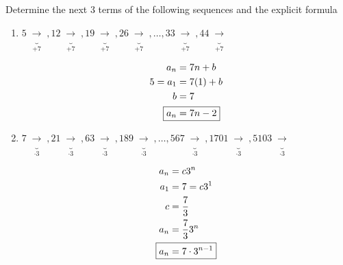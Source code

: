 \documentclass[../../Main.tex]{subfiles}
\begin{document}
\begin{example}
    Determine the next 3 terms of the following sequences and the explicit formula

    \begin{enumerate}
        \item 
        {   
            $
                5\;\underbrace{\longrightarrow}_{+7}\;, 
                12\;\underbrace{\longrightarrow}_{+7}\;, 
                19\;\underbrace{\longrightarrow}_{+7}\;, 
                26\;\underbrace{\longrightarrow}_{+7}\;, 
                \ldots, 
                33\;\underbrace{\longrightarrow}_{+7}\;, 
                44\;\underbrace{\longrightarrow}_{+7}\;
            $
    
            \begin{solution}
                \begin{align*}
                    a_n &= 7n + b \\
                    5 = a_1 &= 7(1) + b \\
                    b &= 7 \\
                    \Aboxed{a_n &= 7n -2} \\
                \end{align*}
            \end{solution}
        }

        \item
        {
            $
                7\;\underbrace{\longrightarrow}_{\cdot 3}\;,
                21\;\underbrace{\longrightarrow}_{\cdot 3}\;,
                63\;\underbrace{\longrightarrow}_{\cdot 3}\;,
                189\;\underbrace{\longrightarrow}_{\cdot 3}\;,
                \ldots,
                567\;\underbrace{\longrightarrow}_{\cdot 3}\;,
                1701\;\underbrace{\longrightarrow}_{\cdot 3}\;,
                5103\;\underbrace{\longrightarrow}_{\cdot 3}\;
            $

            \begin{solution}
                \begin{align*}
                    a_n &= c3^n \\
                    a_1 &= 7 = c3^1 \\
                    c &= \frac{7}{3} \\
                    a_n &= \frac{7}{3} 3^n \\
                    \Aboxed{a_n &= 7 \cdot 3^{n-1}}
                \end{align*}
            \end{solution}
        }


\end{enumerate}
\end{example}
\end{document}
